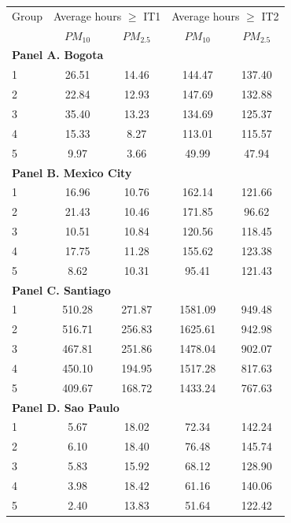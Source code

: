 \begin{tabular}{lcc|cc}
    \toprule
    \toprule
    Group & \multicolumn{2}{c|}{Average hours $\geq$ IT1} & \multicolumn{2}{c}{Average hours $\geq$ IT2} \\
    & $PM_{10}$ & $PM_{2.5}$ & $PM_{10}$ & $PM_{2.5}$ \\
    \midrule
    \multicolumn{5}{l}{\textbf{Panel A. Bogota}} \\
    \midrule
    1 & 26.51 & 14.46 & 144.47 & 137.40 \\
    2 & 22.84 & 12.93 & 147.69 & 132.88 \\
    3 & 35.40 & 13.23 & 134.69 & 125.37 \\
    4 & 15.33 & 8.27 & 113.01 & 115.57 \\
    5 & 9.97 & 3.66 & 49.99 & 47.94 \\
    \midrule
    \multicolumn{5}{l}{\textbf{Panel B. Mexico City}} \\
    \midrule
    1 & 16.96 & 10.76 & 162.14 & 121.66 \\
    2 & 21.43 & 10.46 & 171.85 & 96.62 \\
    3 & 10.51 & 10.84 & 120.56 & 118.45 \\
    4 & 17.75 & 11.28 & 155.62 & 123.38 \\
    5 & 8.62 & 10.31 & 95.41 & 121.43 \\
    \midrule
    \multicolumn{5}{l}{\textbf{Panel C. Santiago}} \\
    \midrule
    1 & 510.28 & 271.87 & 1581.09 & 949.48 \\
    2 & 516.71 & 256.83 & 1625.61 & 942.98 \\
    3 & 467.81 & 251.86 & 1478.04 & 902.07 \\
    4 & 450.10 & 194.95 & 1517.28 & 817.63 \\
    5 & 409.67 & 168.72 & 1433.24 & 767.63 \\
    \midrule
    \multicolumn{5}{l}{\textbf{Panel D. Sao Paulo}} \\
    \midrule
    1 & 5.67 & 18.02 & 72.34 & 142.24 \\
    2 & 6.10 & 18.40 & 76.48 & 145.74 \\
    3 & 5.83 & 15.92 & 68.12 & 128.90 \\
    4 & 3.98 & 18.42 & 61.16 & 140.06 \\
    5 & 2.40 & 13.83 & 51.64 & 122.42 \\
    \bottomrule
    \bottomrule
\end{tabular}
